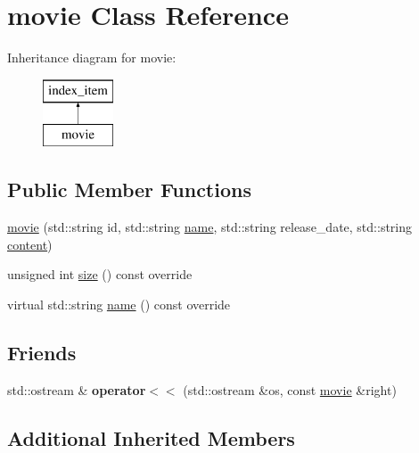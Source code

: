 \hypertarget{classmovie}{}\section{movie Class Reference}
\label{classmovie}
Inheritance diagram for movie\+:\begin{figure}[H]
\begin{center}
\leavevmode
\includegraphics[height=2.000000cm]{classmovie}
\end{center}
\end{figure}
\subsection*{Public Member Functions}
\begin{DoxyCompactItemize}
\item 
\hyperlink{classmovie_ad902758807db02cb4a436249bf671296}{movie} (std\+::string id, std\+::string \hyperlink{classmovie_ab8731bf52d5a7374ecc7ac297e3b99c3}{name}, std\+::string release\+\_\+date, std\+::string \hyperlink{classindex__item_aafe86cc0ad7284d6db317588f63d1cb2}{content})
\item 
unsigned int \hyperlink{classmovie_a06e70f5ada3d72a74ad52a8b49f5cd70}{size} () const override
\item 
virtual std\+::string \hyperlink{classmovie_ab8731bf52d5a7374ecc7ac297e3b99c3}{name} () const override
\end{DoxyCompactItemize}
\subsection*{Friends}
\begin{DoxyCompactItemize}
\item 
\mbox{\label{classmovie_aa9118ce6b1d90c55772771e99d451b9c}} 
std\+::ostream \& {\bfseries operator$<$$<$} (std\+::ostream \&os, const \hyperlink{classmovie}{movie} \&right)
\end{DoxyCompactItemize}
\subsection*{Additional Inherited Members}


